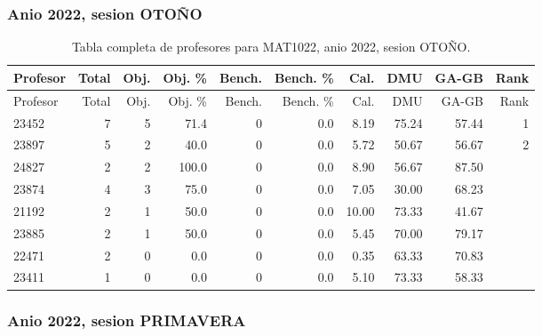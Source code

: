 \subsubsection{Anio 2022, sesion OTOÑO}

\begingroup
\scriptsize
\setlength{\tabcolsep}{3pt}
\begin{longtable}{lrrrrrrrrr}
\caption{Tabla completa de profesores para MAT1022, anio 2022, sesion OTOÑO.}\label{tab:prof-period-mat1022-2022-oto-o}\\
\toprule
Profesor & Total & Obj. & Obj. \% & Bench. & Bench. \% & Cal. & DMU & GA-GB & Rank \\
\midrule
\endfirsthead
\toprule
Profesor & Total & Obj. & Obj. \% & Bench. & Bench. \% & Cal. & DMU & GA-GB & Rank \\
\midrule
\endhead
23452 & 7 & 5 & 71.4 & 0 & 0.0 & 8.19 & 75.24 & 57.44 & 1 \\
23897 & 5 & 2 & 40.0 & 0 & 0.0 & 5.72 & 50.67 & 56.67 & 2 \\
24827 & 2 & 2 & 100.0 & 0 & 0.0 & 8.90 & 56.67 & 87.50 &  \\
23874 & 4 & 3 & 75.0 & 0 & 0.0 & 7.05 & 30.00 & 68.23 &  \\
21192 & 2 & 1 & 50.0 & 0 & 0.0 & 10.00 & 73.33 & 41.67 &  \\
23885 & 2 & 1 & 50.0 & 0 & 0.0 & 5.45 & 70.00 & 79.17 &  \\
22471 & 2 & 0 & 0.0 & 0 & 0.0 & 0.35 & 63.33 & 70.83 &  \\
23411 & 1 & 0 & 0.0 & 0 & 0.0 & 5.10 & 73.33 & 58.33 &  \\
\bottomrule
\end{longtable}
\endgroup

\subsubsection{Anio 2022, sesion PRIMAVERA}

